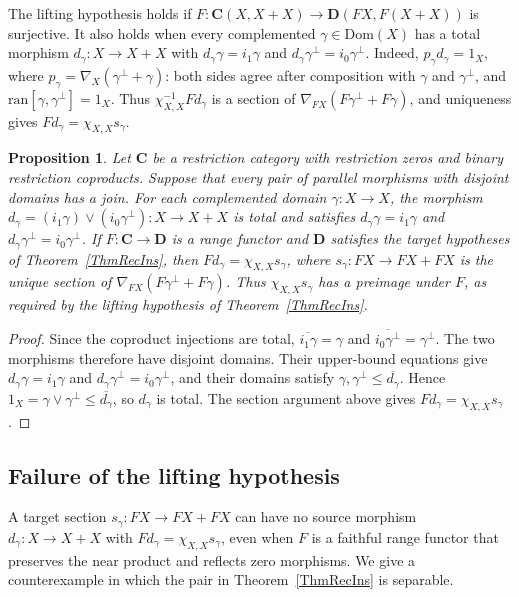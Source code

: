 \documentclass[letterpaper,10pt]{amsart}
\theoremstyle{plain}
\newtheorem{prop}[thm]{Proposition}
\theoremstyle{definition}
\newcommand{\rst}[1]{\overline{#1}}
\begin{document}
The lifting hypothesis holds if
$F:\mathbf C(X,X+X)\to\mathbf D(FX,F(X+X))$ is surjective. It also holds
when every complemented $\gamma\in\mathrm{Dom}(X)$ has a total
morphism $d_\gamma:X\to X+X$ with
$d_\gamma\gamma=i_1\gamma$ and
$d_\gamma\gamma^\perp=i_0\gamma^\perp$. Indeed,
$p_\gamma d_\gamma=1_X$, where
$p_\gamma=\nabla_X(\gamma^\perp+\gamma)$: both sides agree after
composition with $\gamma$ and $\gamma^\perp$, and
$\mathrm{ran}[\gamma,\gamma^\perp]=1_X$. Thus
$\chi_{X,X}^{-1}Fd_\gamma$ is a section of
$\nabla_{FX}(F\gamma^\perp+F\gamma)$, and uniqueness gives
$Fd_\gamma=\chi_{X,X}s_\gamma$.

\begin{prop}\label{PropDisjointJoins}
Let $\mathbf C$ be a restriction category with restriction zeros and
binary restriction coproducts. Suppose that every pair of parallel
morphisms with disjoint domains has a join. For each complemented
domain $\gamma:X\to X$, the morphism
$d_\gamma=(i_1\gamma)\vee(i_0\gamma^\perp):X\to X+X$
is total and satisfies $d_\gamma\gamma=i_1\gamma$ and
$d_\gamma\gamma^\perp=i_0\gamma^\perp$.
If $F:\mathbf C\to\mathbf D$ is a range functor and $\mathbf D$
satisfies the target hypotheses of Theorem~\ref{ThmRecIns}, then
$Fd_\gamma=\chi_{X,X}s_\gamma$, where $s_\gamma:FX\to FX+FX$
is the unique section of $\nabla_{FX}(F\gamma^\perp+F\gamma)$.
Thus $\chi_{X,X}s_\gamma$ has a preimage under $F$, as required
by the lifting hypothesis of
Theorem~\ref{ThmRecIns}.
\end{prop}
\begin{proof}
Since the coproduct injections are total,
$\rst{i_1\gamma}=\gamma$ and
$\rst{i_0\gamma^\perp}=\gamma^\perp$. The two morphisms therefore
have disjoint domains. Their upper-bound equations give
$d_\gamma\gamma=i_1\gamma$ and
$d_\gamma\gamma^\perp=i_0\gamma^\perp$, and their domains satisfy
$\gamma,\gamma^\perp\le\rst{d_\gamma}$. Hence
$1_X=\gamma\vee\gamma^\perp\le\rst{d_\gamma}$, so $d_\gamma$ is
total. The section argument above gives
$Fd_\gamma=\chi_{X,X}s_\gamma$.
\end{proof}

\subsection{Failure of the lifting hypothesis}\label{sec:counterexample}
A target section $s_\gamma:FX\to FX+FX$ can have no source
morphism $d_\gamma:X\to X+X$ with
$Fd_\gamma=\chi_{X,X}s_\gamma$, even when $F$ is a faithful range
functor that preserves the near product and reflects zero morphisms. We give a counterexample
in which the pair in Theorem~\ref{ThmRecIns} is separable.
\end{document}
